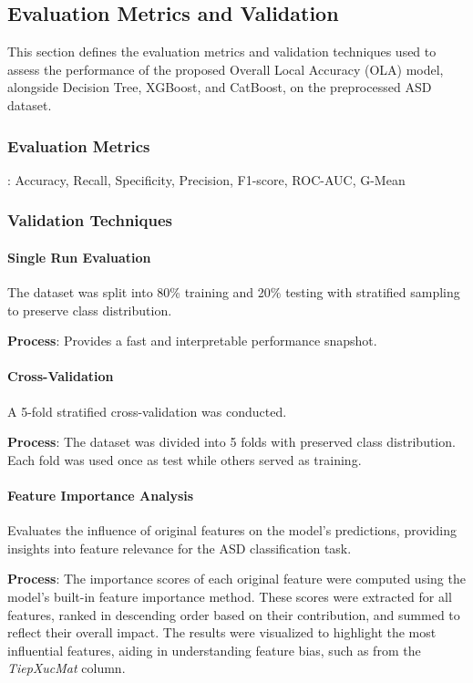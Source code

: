 \documentclass[conference]{IEEEtran}
\begin{document}
\subsection{Evaluation Metrics and Validation}

This section defines the evaluation metrics and validation techniques used to assess the performance of the proposed Overall Local Accuracy (OLA) model, alongside Decision Tree, XGBoost, and CatBoost, on the preprocessed ASD dataset.

\subsubsection{Evaluation Metrics}: Accuracy, Recall, Specificity, Precision, F1-score, ROC-AUC, G-Mean

\subsubsection{Validation Techniques}

\paragraph{Single Run Evaluation}

The dataset was split into 80\% training and 20\% testing with stratified sampling to preserve class distribution.  

\textbf{Process}: Provides a fast and interpretable performance snapshot.

\paragraph{Cross-Validation}

A 5-fold stratified cross-validation was conducted.  

\textbf{Process}: The dataset was divided into 5 folds with preserved class distribution. Each fold was used once as test while others served as training.  

\paragraph{Feature Importance Analysis}

Evaluates the influence of original features on the model's predictions, providing insights into feature relevance for the ASD classification task.

\textbf{Process}: The importance scores of each original feature were computed using the model's built-in feature importance method. These scores were extracted for all features, ranked in descending order based on their contribution, and summed to reflect their overall impact. The results were visualized to highlight the most influential features, aiding in understanding feature bias, such as from the \textit{TiepXucMat} column.
\end{document}
